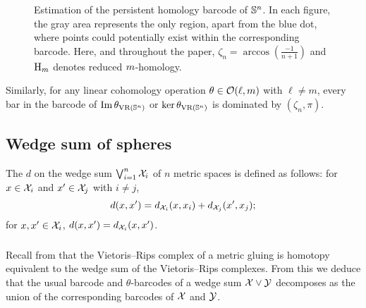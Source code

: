 \begin{figure}[ht]
	\centering
	
	\caption{Estimation of the persistent homology barcode of $\mathbb{S}^n$.
		In each figure, the gray area represents the only region, apart from the blue dot, where points could potentially exist within the corresponding barcode.
		Here, and throughout the paper, $\zeta_n = \arccos(\tfrac{-1}{n+1})$ and $\mathrm{H}_m $ denotes reduced $m$-homology. 
        }
	\label{fig:Sk}
\end{figure}

Similarly, for any linear cohomology operation $\theta \in \mathcal{O}(\ell,m)$ with $\ell \neq m$, every bar in the barcode of $\operatorname{Im}\theta_{\operatorname{VR}(\mathbb{S}^n)}$ or $\ker\theta_{\operatorname{VR}(\mathbb{S}^n)}$ is dominated by $(\zeta_n,\pi)$.


\subsection{Wedge sum of spheres}

The  $d$ on the wedge sum $\bigvee_{i=1}^n \mathcal{X}_i$ of $n$ metric spaces is defined as follows: for $x \in \mathcal{X}_i$ and $x' \in \mathcal{X}_j$ with $i \neq j$,
\[
d(x, x') = d_{\mathcal{X}_i}(x, x_i) + d_{\mathcal{X}_j}(x', x_j);
\]
for $x, x' \in \mathcal{X}_i$, $d(x, x') = d_{\mathcal{X}_i}(x, x')$.


\subsubsection{}\label{prop:wedge sum}
Recall from \cite[Proposition 1 \& Corollary 2]{adamaszek2020homotopy} that the Vietoris--Rips complex of a metric gluing is homotopy equivalent to the wedge sum of the Vietoris--Rips complexes.
From this we deduce that the usual barcode and $\theta$-barcodes of a wedge sum $\mathcal{X} \vee \mathcal{Y}$ decomposes as the union of the corresponding barcodes of $\mathcal{X}$ and $\mathcal{Y}$.


